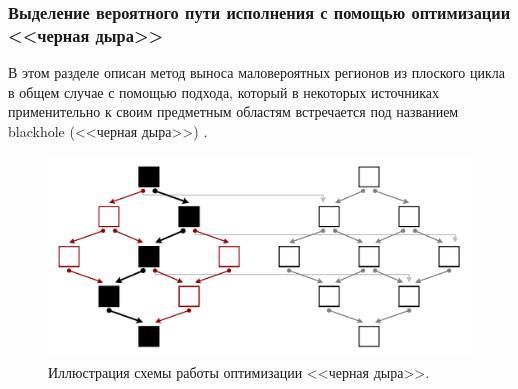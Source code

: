 \subsubsection{Выделение вероятного пути исполнения с помощью оптимизации <<черная дыра>>}

В этом разделе описан метод выноса маловероятных регионов из плоского цикла в общем случае с помощью подхода, который в некоторых источниках применительно к своим предметным областям встречается под названием blackhole (<<черная дыра>>) \cite{Ilbeyi2019}.

\begin{figure}[ht]
	\centering
	\includegraphics[width=1.0\textwidth]{./pics/text_4_vec_loc_branch/blackhole.pdf}
	\caption{Иллюстрация схемы работы оптимизации <<черная дыра>>.}
	\label{fig:text_4_vec_loc_branch_blackhole}
\end{figure}

